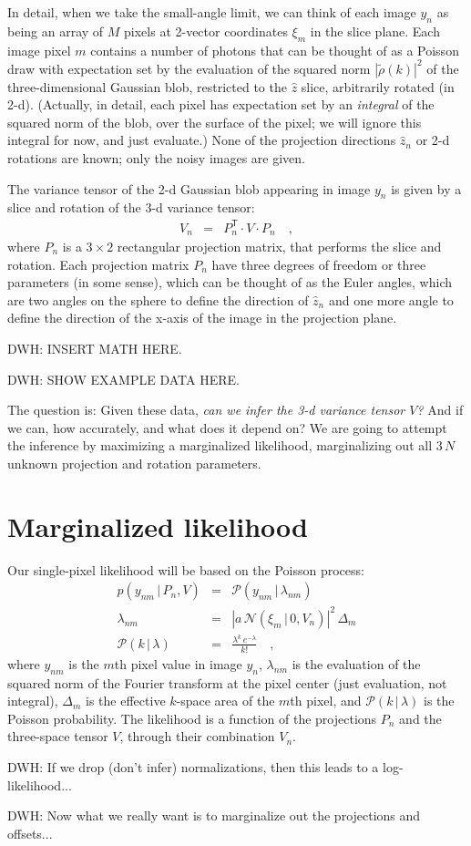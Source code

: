 \documentclass[12pt]{article}
\newcommand{\normal}{\mathscr{N}}
\newcommand{\Poisson}{\mathscr{P}}
\newcommand{\ft}[1]{\tilde{#1}}
\newcommand{\sqnorm}[1]{|{#1}|^2}
\newcommand{\unitvec}[1]{\hat{#1}}
\newcommand{\zhat}{\unitvec{z}}
\newcommand{\transpose}{^{\mathsf{T}}}
\newcommand{\given}{\,|\,}
\begin{document}
In detail, when we take the small-angle limit, we can think of each
image $y_n$ as being an array of $M$ pixels at
2-vector coordinates $\xi_m$ in the slice plane.
Each image pixel $m$ contains a number of photons that can be thought
of as a Poisson draw with expectation set by the evaluation of the
squared norm $\sqnorm{\ft{\rho}(k)}$ of the three-dimensional Gaussian
blob, restricted to the $\hat{z}$ slice, arbitrarily rotated (in 2-d).
(Actually, in detail, each pixel has expectation set by an
\emph{integral} of the squared norm of the blob, over the surface of
the pixel; we will ignore this integral for now, and just evaluate.)
None of the projection directions $\zhat_n$ or 2-d rotations are
known; only the noisy images are given.

The variance tensor of the 2-d Gaussian blob appearing in image $y_n$
is given by a slice and rotation of the 3-d variance tensor:
\begin{eqnarray}
  V_n &=& P_n\transpose\cdot V\cdot P_n
  \quad ,
\end{eqnarray}
where $P_n$ is a $3\times 2$ rectangular projection matrix, that
performs the slice and rotation.
Each projection matrix $P_n$ have three degrees of freedom or three
parameters (in some sense), which can be thought of as the Euler
angles, which are two angles on the sphere to define the direction of
$\zhat_n$ and one more angle to define the direction of the x-axis of
the image in the projection plane.

DWH: INSERT MATH HERE.

DWH: SHOW EXAMPLE DATA HERE.

The question is:
Given these data, \emph{can we infer the 3-d variance tensor $V$?}
And if we can, how accurately, and what does it depend on?  We are
going to attempt the inference by maximizing a marginalized
likelihood, marginalizing out all $3\,N$ unknown projection and
rotation parameters.

\section{Marginalized likelihood}

Our single-pixel likelihood will be based on the Poisson process:
\begin{eqnarray}
  p(y_{nm}\given P_n,V) &=& \Poisson(y_{nm}\given\lambda_{nm})
  \\
  \lambda_{nm} &=& \sqnorm{a\,\normal(\xi_m\given 0,V_n)}\,\Delta_m
  \\
  \Poisson(k\given\lambda) &=& \frac{\lambda^k\,e^{-\lambda}}{k!}
  \quad,
\end{eqnarray}
where $y_{nm}$ is the $m$th pixel value in image $y_n$,
$\lambda_{nm}$ is the evaluation of the squared norm of the Fourier
transform at the pixel center (just evaluation, not integral),
$\Delta_m$ is the effective $k$-space area of the $m$th pixel,
and $\Poisson(k\given\lambda)$ is the Poisson probability.
The likelihood is a function of the projections $P_n$ and the
three-space tensor $V$, through their combination $V_n$.

DWH: If we drop (don't infer) normalizations, then this leads to a
log-likelihood...

DWH: Now what we really want is to marginalize out the projections and
offsets...
\end{document}
